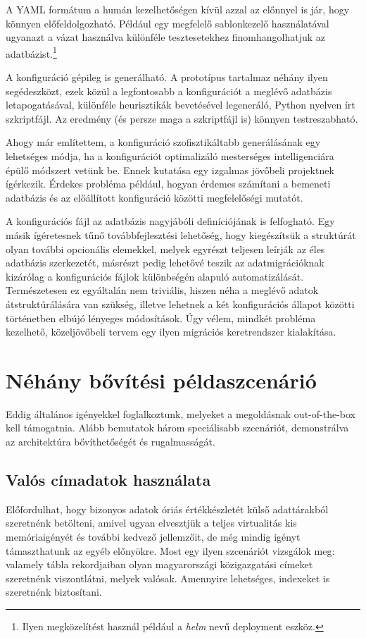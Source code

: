 \documentclass[
    parspace,
    noindent,
    nohyp,
]{elteiktdk}[2023/04/10]
\begin{document}
A YAML formátum a humán kezelhetőségen kívül azzal az előnnyel is jár, hogy könnyen előfeldolgozható.
Például egy megfelelő sablonkezelő használatával ugyanazt a vázat használva
különféle tesztesetekhez finomhangolhatjuk az adatbázist.\footnote{
    Ilyen megközelítést használ például a \textit{helm} nevű deployment eszköz.
}

A konfiguráció gépileg is generálható.
A prototípus tartalmaz néhány ilyen segédeszközt,
ezek közül a legfontosabb a konfigurációt a meglévő adatbázis letapogatásával,
különféle heurisztikák bevetésével legeneráló, Python nyelven írt szkriptfájl.
Az eredmény (és persze maga a szkriptfájl is) könnyen testreszabható.

Ahogy már említettem, a konfiguráció szofisztikáltabb generálásának egy lehetséges módja,
ha a konfigurációt optimalizáló mesterséges intelligenciára épülő módszert vetünk be.
Ennek kutatása egy izgalmas jövőbeli projektnek ígérkezik.
Érdekes probléma például, hogyan érdemes számítani a bemeneti adatbázis
és az előállított konfiguráció közötti megfelelőségi mutatót.

A konfigurációs fájl az adatbázis nagyjábóli definíciójának is felfogható.
Egy másik ígéretesnek tűnő továbbfejlesztési lehetőség,
hogy kiegészítsük a struktúrát olyan további opcionális elemekkel,
melyek egyrészt teljesen leírják az éles adatbázis szerkezetét,
másrészt pedig lehetővé teszik az adatmigrációknak
kizárólag a konfigurációs fájlok különbségén alapuló automatizálását.
Természetesen ez egyáltalán nem triviális,
hiszen néha a meglévő adatok átstruktúrálására van szükség,
illetve lehetnek a két konfigurációs állapot közötti történetben elbújó lényeges módosítások.
Úgy vélem, mindkét probléma kezelhető,
közeljövőbeli tervem egy ilyen migrációs keretrendszer kialakítása.


\section{Néhány bővítési példaszcenárió}

Eddig általános igényekkel foglalkoztunk,
melyeket a megoldásnak out-of-the-box kell támogatnia.
Alább bemutatok három speciálisabb szcenáriót,
demonstrálva az architektúra bővíthetőségét és rugalmasságát.

\subsection{Valós címadatok használata}

Előfordulhat, hogy bizonyos adatok óriás értékkészletét külső adattárakból szeretnénk betölteni,
amivel ugyan elvesztjük a teljes virtualitás kis memóriaigényét és további kedvező jellemzőit,
de még mindig igényt támaszthatunk az egyéb előnyökre.
Most egy ilyen szcenáriót vizsgálok meg:
valamely tábla rekordjaiban olyan magyarországi közigazgatási címeket szeretnénk viszontlátni,
melyek valósak.
Amennyire lehetséges, indexeket is szeretnénk biztosítani.
\end{document}
